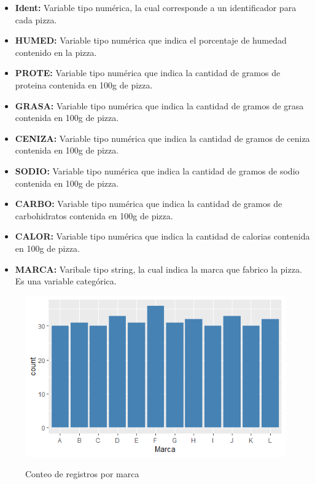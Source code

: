 \documentclass[pdf]{beamer}
\begin{document}
\begin{frame}
\begin{itemize}
\item \textbf{Ident:} Variable tipo numérica, la cual corresponde a un identificador para cada pizza.
\item \textbf{HUMED:} Variable tipo numérica que indica el porcentaje de humedad contenido en la pizza.
\item \textbf{PROTE:} Variable tipo numérica que indica la cantidad de gramos de proteina contenida en 100g de pizza.
\item \textbf{GRASA:} Variable tipo numérica que indica la cantidad de gramos de grasa contenida en 100g de pizza.
\item \textbf{CENIZA:} Variable tipo numérica que indica la cantidad de gramos de ceniza contenida en 100g de pizza.
\item \textbf{SODIO:} Variable tipo numérica que indica la cantidad de gramos de sodio contenida en 100g de pizza.
\item \textbf{CARBO:} Variable tipo numérica que indica la cantidad de gramos de carbohidratos contenida en 100g de pizza.
\item \textbf{CALOR:} Variable tipo numérica que indica la cantidad de calorias contenida en 100g de pizza.
\item \textbf{MARCA:} Varibale tipo string, la cual indica la marca que fabrico la pizza. Es una variable categórica.
\end{itemize}
\end{frame}

\begin{frame}
\begin{figure}[h]
\centering
\includegraphics[scale=.65]{images/marca.png} 
\label{i1}
\caption{Conteo de registros por marca}
\end{figure}
\end{frame}
\end{document}

